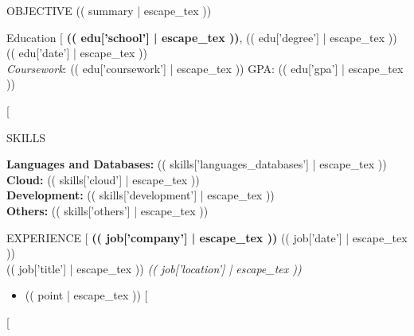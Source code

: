 \documentclass{resume_style} %
\begin{document}
\vspace{-0.9em}
\begin{rSection}{OBJECTIVE}
\vspace{-0.2em}
(( summary | escape_tex ))
\end{rSection}

\vspace{-0.8em}
\begin{rSection}{Education}
[%
    {\bf (( edu['school'] | escape_tex ))}, (( edu['degree'] | escape_tex )) \hfill {(( edu['date'] | escape_tex ))}\\
    \textit{Coursework}: (( edu['coursework'] | escape_tex )) \hfill GPA: (( edu['gpa'] | escape_tex ))
    \vspace{-0.3em}

[%
\end{rSection}

\vspace{-0.8em}
\begin{rSection}{SKILLS}
    \begin{flushleft}
    \textbf{Languages and Databases:} (( skills['languages_databases'] | escape_tex )) \\
    \textbf{Cloud:} (( skills['cloud'] | escape_tex )) \\
    \textbf{Development:} (( skills['development'] | escape_tex )) \\
    \textbf{Others:} (( skills['others'] | escape_tex )) \\
    \end{flushleft}
\end{rSection}

\vspace{-0.75em}
\begin{rSection}{EXPERIENCE}
[%
    \textbf{(( job['company'] | escape_tex ))} \hfill (( job['date'] | escape_tex ))\\
    (( job['title'] | escape_tex )) \hfill \textit{(( job['location'] | escape_tex ))}
    \vspace{-0.4em}
    \begin{itemize}
        \setlength{\itemsep}{2pt}
        \setlength{\parskip}{0pt}
        \setlength{\parsep}{1pt}
        [%
            \item (( point | escape_tex ))
        [%
    \end{itemize}
    \vspace{-0.2em}
[%
\end{rSection} 
\end{document}
